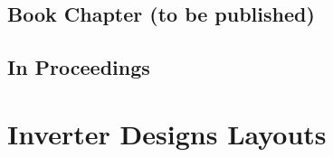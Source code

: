 \documentclass[pgmicro,diss,english]{iiufrgs}
\begin{document}

\section{Book Chapter (to be published)}


\section{In Proceedings}




\chapter{Inverter Designs Layouts}
\end{document}
